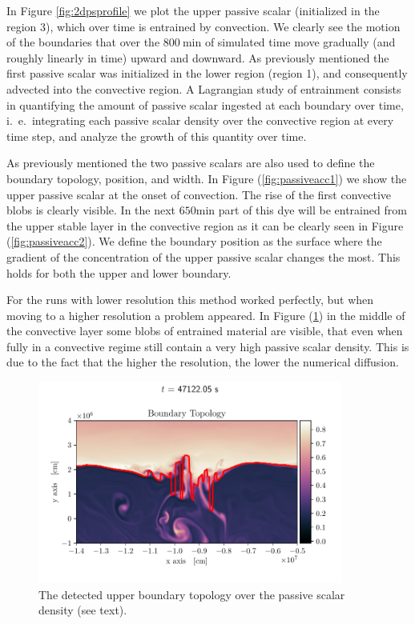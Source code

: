 In Figure \ref{fig:2dpsprofile} we plot the upper passive scalar (initialized in the region 3), which over time is entrained by convection. We clearly see the motion of the boundaries that over the $800 \ \mathrm{min}$ of simulated time move gradually (and roughly linearly in time) upward and downward. As previously mentioned the first passive scalar was initialized in the lower region (region 1), and consequently advected into the convective region. A Lagrangian study of entrainment consists in quantifying the amount of passive scalar ingested at each boundary over time, i.\ e.\ integrating each passive scalar density over the convective region at every time step, and analyze the growth of this quantity over time.

As previously mentioned the two passive scalars are also used to define the boundary topology, position, and width. In Figure (\ref{fig:passiveacc1}) we show the upper passive scalar at the onset of convection. The rise of the first convective blobs is clearly visible. In the next $650 \mathrm{min}$ part of this dye will be entrained from the upper stable layer in the convective region as it can be clearly seen in Figure (\ref{fig:passiveacc2}). We define the boundary position as the surface where the gradient of the concentration of the upper passive scalar changes the most. This holds for both the upper and lower boundary.
  
For the runs with lower resolution this method worked perfectly, but when moving to a higher resolution a problem appeared.  In Figure (\ref{fig:topology})  in the middle of the convective layer some blobs of entrained material are visible, that even when fully in a convective regime still contain a very high passive scalar density. This is due to the fact that the higher the resolution, the lower the numerical diffusion.
  
\begin{figure}[t!]
\centering
\includegraphics[width=10cm]{./img/topology.pdf}
\caption{The detected upper boundary topology over the passive scalar density (see text).}
\label{fig:topology}
\centering
\end{figure}

